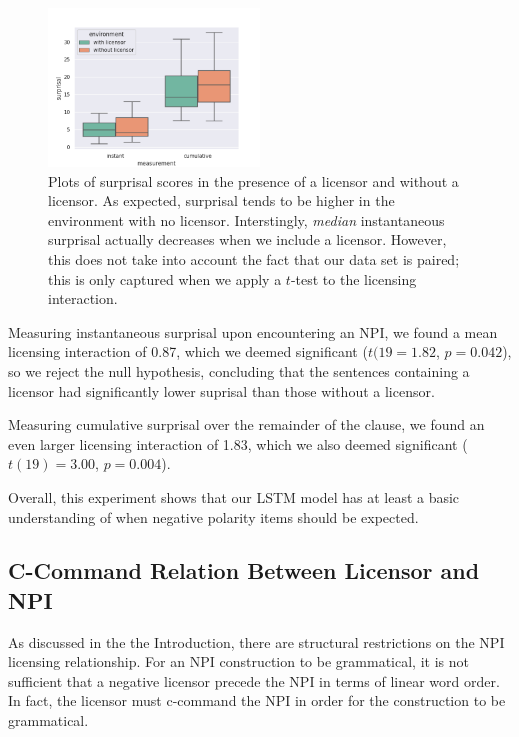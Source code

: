 \documentclass[11pt, round]{article}
\begin{document}
\begin{figure}
    \centering
    \includegraphics[width=0.5\textwidth]{surprisal-c-command-box-plot}
    \caption{Plots of surprisal scores in the presence of a licensor and without a licensor. As expected, surprisal tends to be higher in the environment with no licensor. Interstingly, \textit{median} instantaneous surprisal actually decreases when we include a licensor. However, this does not take into account the fact that our data set is paired; this is only captured when we apply a $t$-test to the licensing interaction.}
    \label{fig:basic-detection-box-plot}
\end{figure}

Measuring instantaneous surprisal upon encountering an NPI, we found a mean licensing interaction of 0.87, which we deemed significant ($t(19 = 1.82$, $p = 0.042$), so we reject the null hypothesis, concluding that the sentences containing a licensor had significantly lower suprisal than those without a licensor.

Measuring cumulative surprisal over the remainder of the clause, we found an even larger licensing interaction of 1.83, which we also deemed significant ($t(19) = 3.00$, $p = 0.004$).

Overall, this experiment shows that our LSTM model has at least a basic understanding of when negative polarity items should be expected.

\subsection{C-Command Relation Between Licensor and NPI}
\label{sec:c-command}

As discussed in the the Introduction, there are structural restrictions on the NPI licensing relationship. For an NPI construction to be grammatical, it is not sufficient that a negative licensor precede the NPI in terms of linear word order. In fact, the licensor must c-command the NPI in order for the construction to be grammatical.
\end{document}
